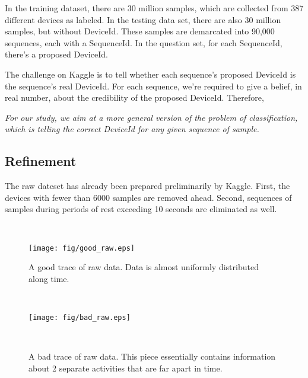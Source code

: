 \documentclass{article} %
\begin{document}
In the training dataset, there are 30 million samples, which are collected from 387 different devices as labeled. In the testing data set, there are also 30 million samples, but without DeviceId. These samples are demarcated into 90,000 sequences, each with a SequenceId. In the question set, for each SequenceId, there's a proposed DeviceId.

The challenge on Kaggle is to tell whether each sequence's proposed DeviceId is the sequence's real DeviceId. For each sequence, we're required to give a belief, in real number, about the credibility of the proposed DeviceId. Therefore, 

 \emph{For our study, we aim at a more general version of the problem of classification, which is telling the correct DeviceId for any given sequence of sample.}

\subsection{Refinement}
The raw dateset has already been prepared preliminarily by Kaggle. First, the devices with fewer than 6000 samples are removed ahead. Second, sequences of samples during periods of rest exceeding 10 seconds are eliminated as well. 

\begin{figure}
    \hspace{-0.5cm}
    \begin{minipage}[t]{0.02\textwidth}~
    \end{minipage}
    \begin{minipage}[t]{0.47\textwidth}
    \centering
    \texttt{[image: fig/good\_raw.eps]}
    \caption{A good trace of raw data. Data is almost uniformly distributed along time. }
    \label{fig:good_raw}
    \end{minipage}
    \begin{minipage}[t]{0.02\textwidth}~
    \end{minipage}
    \begin{minipage}[t]{0.47\textwidth}
    \centering
    \texttt{[image: fig/bad\_raw.eps]}\\
    \caption{A bad trace of raw data. This piece essentially contains information about 2 separate activities that are far apart in time.}
    \label{fig:bad_raw}
    \end{minipage}
    \begin{minipage}[t]{0.02\textwidth}~
    \end{minipage}%
 \end{figure}
\end{document}
